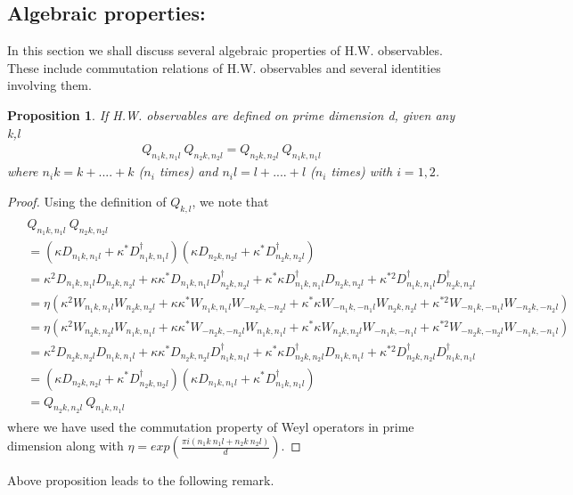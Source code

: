 \documentclass[12pt]{amsart}
\numberwithin{equation}{section}
\newtheorem{proposition}{Proposition}[section]
\begin{document}
\subsection{Algebraic properties:}
In this section we shall discuss several algebraic properties of H.W. observables. These include commutation relations of H.W. observables and several identities involving them. \\
\begin{proposition}
    If H.W. observables are defined on prime dimension d, given any k,l 
    \begin{eqnarray*}
        Q_{n_1k,n_1l}~ Q_{n_2k,n_2l}=Q_{n_2k,n_2l}~Q_{n_1k,n_1l}
    \end{eqnarray*}
    where $n_ik=k + ....+k$ ($n_i$ times) and $n_il= l+....+ l$ ($n_i$ times) with $i=1,2$.
\end{proposition}
\begin{proof}
    Using the definition of $Q_{k,l}$, we note that
    \begin{eqnarray*}
        \begin{split}
         &Q_{n_1k,n_1l}~ Q_{n_2k,n_2l}\\
         &=\left( \kappa D_{n_1k,n_1l}+\kappa^* D^{\dagger}_{n_1k,n_1l}\right) \left( \kappa D_{n_2k,n_2l}+\kappa^* D^{\dagger}_{n_2k,n_2l}\right) \\
         &=\kappa^2 D_{n_1k,n_1l} D_{n_2k,n_2l} +\kappa \kappa^* D_{n_1k,n_1l}D^{\dagger}_{n_2k,n_2l}+\kappa^*\kappa D^{\dagger}_{n_1k,n_1l}D_{n_2k,n_2l}+\kappa^{*2} D^{\dagger}_{n_1k,n_1l}D^{\dagger}_{n_2k,n_2l}\\
         &= \eta \left(\kappa^2 W_{n_1k,n_1l} W_{n_2k,n_2l} +\kappa \kappa^* W_{n_1k,n_1l}W_{-n_2k,-n_2l}+\kappa^*\kappa W_{-n_1k,-n_1l}W_{n_2k,n_2l}+\kappa^{*2} W_{-n_1k,-n_1l}W_{-n_2k,-n_2l} \right)\\
         &=\eta \left(\kappa^2 W_{n_2k,n_2l} W_{n_1k,n_1l}  +\kappa \kappa^* W_{-n_2k,-n_2l} W_{n_1k,n_1l}+\kappa^*\kappa W_{n_2k,n_2l} W_{-n_1k,-n_1l}+\kappa^{*2} W_{-n_2k,-n_2l} W_{-n_1k,-n_1l} \right)\\
         &=\kappa^2D_{n_2k,n_2l}  D_{n_1k,n_1l}  +\kappa \kappa^* D_{n_2k,n_2l} D^{\dagger}_{n_1k,n_1l}+\kappa^*\kappa D^{\dagger}_{n_2k,n_2l}D_{n_1k,n_1l}+\kappa^{*2} D^{\dagger}_{n_2k,n_2l} D^{\dagger}_{n_1k,n_1l}\\
         &=\left( \kappa D_{n_2k,n_2l}+ \kappa^* D^{\dagger}_{n_2k,n_2l}\right) \left(\kappa D_{n_1k,n_1l}+ \kappa^* D^{\dagger}_{n_1k,n_1l} \right)\\
         &=Q_{n_2k,n_2l}~Q_{n_1k,n_1l}
        \end{split}
    \end{eqnarray*}
    where we have used the commutation property of Weyl operators in prime dimension \cite{CS2016} along with $\eta=exp \left( \frac{\pi i (n_1k~n_1l+n_2k~n_2l)}{d}\right)$.
\end{proof}
Above proposition leads to the following remark.\\
\end{document}

